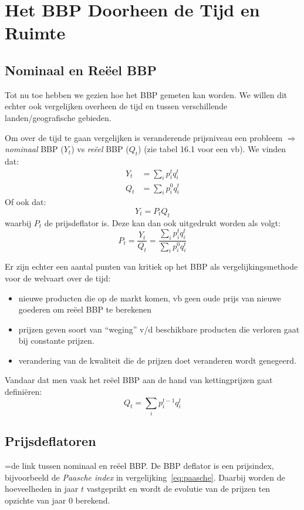 \section{Het BBP Doorheen de Tijd en Ruimte}

\subsection{Nominaal en Re\"eel BBP}
Tot nu toe hebben we gezien hoe het BBP gemeten kan worden. We willen dit echter ook vergelijken overheen de tijd en tussen verschillende landen/geografische gebieden.

Om over de tijd te gaan vergelijken is veranderende prijsniveau een probleem $\Rightarrow$ \textit{nominaal} BBP ($Y_t$) vs \textit{re\"eel} BBP ($Q_t$) (zie tabel 16.1 voor een vb). We vinden dat:
\begin{align}
    Y_t &= \sum_i p_i^t q_i^t \\
    Q_t &= \sum_i p_i^0 q_i^t
\end{align}
Of ook dat:
\begin{equation}
    Y_t = P_t Q_t
\end{equation}
waarbij $P_t$ de prijsdeflator is. Deze kan dan ook uitgedrukt worden als volgt:
\begin{equation}
    P_t = \frac{Y_t}{Q_t} = \frac{\sum_i p_i^t q_i^t}{\sum_i p_i^0 q_i^t} \label{eq:paasche}
\end{equation}

Er zijn echter een aantal punten van kritiek op het BBP als vergelijkingsmethode voor de welvaart over de tijd:
\begin{itemize}
    \item nieuwe producten die op de markt komen, vb geen oude prijs van nieuwe goederen om re\"eel BBP te berekenen
    \item prijzen geven soort van ``weging'' v/d beschikbare producten die verloren gaat bij constante prijzen.
    \item verandering van de kwaliteit die de prijzen doet veranderen wordt genegeerd.
\end{itemize}

Vandaar dat men vaak het re\"eel BBP aan de hand van kettingprijzen gaat defini\"eren:
\begin{equation}
    Q_t = \sum_i p_i^{t-1} q_i^t
\end{equation}

\subsection{Prijsdeflatoren}
=de link tussen nominaal en re\"eel BBP. De BBP deflator is een prijsindex, bijvoorbeeld de \textit{Paasche index} in vergelijking~\eqref{eq:paasche}. Daarbij worden de hoeveelheden in jaar $t$ vastgeprikt en wordt de evolutie van de prijzen ten opzichte van jaar $0$ berekend.

